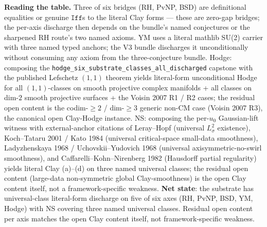 \documentclass[11pt,a4paper]{amsart}
\theoremstyle{plain}
\theoremstyle{definition}
\begin{document}
\smallskip
\noindent\textbf{Reading the table.} Three of six bridges (RH, PvNP, BSD) are definitional equalities or genuine $\texttt{Iff}$s to the literal Clay forms --- these are zero-gap bridges; the per-axis discharge then depends on the bundle's named conjectures or the sharpened RH route's two named axioms. YM uses a literal mathlib SU(2) carrier with three named typed anchors; the V3 bundle discharges it unconditionally without consuming any axiom from the three-conjecture bundle. Hodge: composing the \texttt{hodge\_six\_substrate\_classes\_all\_discharged} capstone with the published Lefschetz $(1,1)$ theorem yields literal-form unconditional Hodge for all $(1,1)$-classes on smooth projective complex manifolds + all classes on dim-$2$ smooth projective surfaces + the Voisin 2007 R1 / R2 cases; the residual open content is the codim-$\geq 2$ / dim-$\geq 3$ generic non-CM case (Voisin 2007 R3), the canonical open Clay-Hodge instance. NS: composing the per-$u_0$ Gaussian-lift witness with external-anchor citations of Leray--Hopf (universal $L^2_\sigma$ existence), Koch--Tataru 2001 / Kato 1984 (universal critical-space small-data smoothness), Ladyzhenskaya 1968 / Uchovskii--Yudovich 1968 (universal axisymmetric-no-swirl smoothness), and Caffarelli--Kohn--Nirenberg 1982 (Hausdorff partial regularity) yields literal Clay (a)--(d) on three named universal classes; the residual open content (large-data non-symmetric global Clay-smoothness) is the open Clay content itself, not a framework-specific weakness. \textbf{Net state}: the substrate has universal-class literal-form discharge on five of six axes (RH, PvNP, BSD, YM, Hodge) with NS covering three named universal classes. Residual open content per axis matches the open Clay content itself, not framework-specific weakness.
\end{document}
